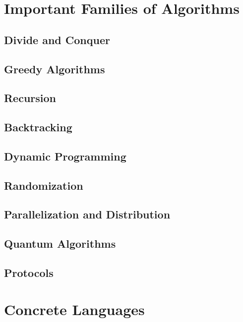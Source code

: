\documentclass{book}
\begin{document}
\part{Important Families of Algorithms}\label{sec:ad:algo}

\chapter{Divide and Conquer}
 
\chapter{Greedy Algorithms}

\chapter{Recursion}

\chapter{Backtracking}

\chapter{Dynamic Programming}

\chapter{Randomization}

\chapter{Parallelization and Distribution}

\chapter{Quantum Algorithms}

\chapter{Protocols}

\part{Concrete Languages}
\end{document}
